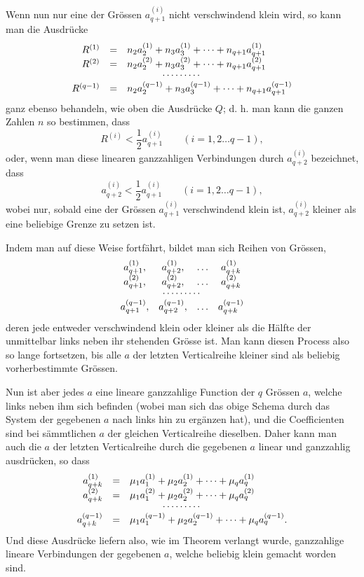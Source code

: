 \documentclass[10pt]{article}
\begin{document}
Wenn nun nur eine der Grössen \(a_{q+1}^{(i)}\) nicht verschwindend klein wird, so kann man die Ausdrücke
\[
\begin{array}{rcl}
R^{(1)}&=&n_2a_2^{(1)}+n_3a_3^{(1)}+\cdots+n_{q+1}a_{q+1}^{(1)}\\
R^{(2)}&=&n_2a_2^{(2)}+n_3a_3^{(2)}+\cdots+n_{q+1}a_{q+1}^{(2)}\\[-0.15em]
\multicolumn{3}{c}{\cdots\cdots\cdots}\\
R^{(q-1)}&=&n_2a_2^{(q-1)}+n_3a_3^{(q-1)}+\cdots+n_{q+1}a_{q+1}^{(q-1)}
\end{array}
\]
ganz ebenso behandeln, wie oben die Ausdrücke \(Q\); d. h. man kann die ganzen Zahlen \(n\) so bestimmen, dass
\[
R^{(i)}<\frac12a_{q+1}^{(i)}\qquad(i=1,2\ldots q-1),
\]
oder, wenn man diese linearen ganzzahligen Verbindungen durch \(a_{q+2}^{(i)}\) bezeichnet, dass
\[
a_{q+2}^{(i)}<\frac12a_{q+1}^{(i)}\qquad(i=1,2\ldots q-1),
\]
wobei nur, sobald eine der Grössen \(a_{q+1}^{(i)}\) verschwindend klein ist, \(a_{q+2}^{(i)}\) kleiner als eine beliebige Grenze zu setzen ist.

Indem man auf diese Weise fortfährt, bildet man sich Reihen von Grössen,
\[
\begin{array}{cccc}
a_{q+1}^{(1)},&a_{q+2}^{(1)},&\ldots&a_{q+k}^{(1)}\\
a_{q+1}^{(2)},&a_{q+2}^{(2)},&\ldots&a_{q+k}^{(2)}\\[-0.15em]
\multicolumn{4}{c}{\cdots\cdots\cdots}\\
a_{q+1}^{(q-1)},&a_{q+2}^{(q-1)},&\ldots&a_{q+k}^{(q-1)}
\end{array}
\]
deren jede entweder verschwindend klein oder kleiner als die Hälfte der unmittelbar links neben ihr stehenden Grösse ist. Man kann diesen Process also so lange fortsetzen, bis alle \(a\) der letzten Verticalreihe kleiner sind als beliebig vorherbestimmte Grössen.

Nun ist aber jedes \(a\) eine lineare ganzzahlige Function der \(q\) Grössen \(a\), welche links neben ihm sich befinden (wobei man sich das obige Schema durch das System der gegebenen \(a\) nach links hin zu ergänzen hat), und die Coefficienten sind bei sämmtlichen \(a\) der gleichen Verticalreihe dieselben. Daher kann man auch die \(a\) der letzten Verticalreihe durch die gegebenen \(a\) linear und ganzzahlig ausdrücken, so dass
\[
\begin{array}{rcl}
a_{q+k}^{(1)}&=&\mu_1a_1^{(1)}+\mu_2a_2^{(1)}+\cdots+\mu_qa_q^{(1)}\\
a_{q+k}^{(2)}&=&\mu_1a_1^{(2)}+\mu_2a_2^{(2)}+\cdots+\mu_qa_q^{(2)}\\[-0.15em]
\multicolumn{3}{c}{\cdots\cdots\cdots}\\
a_{q+k}^{(q-1)}&=&\mu_1a_1^{(q-1)}+\mu_2a_2^{(q-1)}+\cdots+\mu_qa_q^{(q-1)}.
\end{array}
\]
Und diese Ausdrücke liefern also, wie im Theorem verlangt wurde, ganzzahlige lineare Verbindungen der gegebenen \(a\), welche beliebig klein gemacht worden sind.
\end{document}

